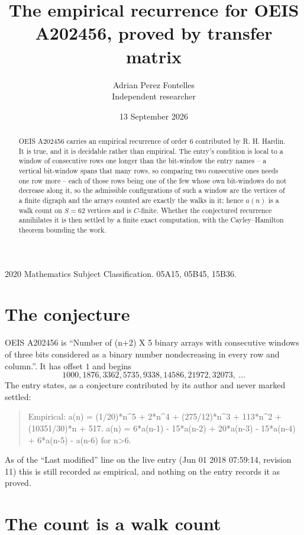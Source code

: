\documentclass[11pt,a4paper]{article}
\title{The empirical recurrence for OEIS A202456, proved by transfer matrix}
\author{Adrian Perez Fontelles\\ \small Independent researcher}
\date{13 September 2026}
\theoremstyle{plain}
\theoremstyle{definition}
\begin{document}
\maketitle

\begin{abstract}
OEIS A202456 carries an empirical recurrence of order $6$ contributed by R. H. Hardin. It is
true, and it is decidable rather than empirical. The entry's condition is local to a window of consecutive rows one longer than the bit-window the entry names -- a vertical bit-window spans that many rows, so comparing two consecutive ones needs one row more -- each of those rows being one of the few whose own bit-windows do not decrease along it, so
the admissible configurations of such a window are the vertices of a finite digraph and the
arrays counted are exactly the walks in it; hence $a(n)$ is a walk count on $S=62$ vertices
and is $C$-finite. Whether the conjectured recurrence annihilates it is then settled by a
finite exact computation, with the Cayley--Hamilton theorem bounding the work.
\end{abstract}

\noindent\small 2020 Mathematics Subject Classification. 05A15, 05B45, 15B36.\normalsize

\section{The conjecture}

OEIS A202456 is ``Number of (n+2) X 5 binary arrays with consecutive windows of three bits considered as a binary number nondecreasing in every row and column.''. It has offset $1$ and begins
\[
1000, 1876, 3362, 5735, 9338, 14586, 21972, 32073,\ \dots
\]
The entry states, as a conjecture contributed by its author and never marked settled:
\begin{quote}
Empirical: a(n) = (1/20)*n\^{}5 + 2*n\^{}4 + (275/12)*n\^{}3 + 113*n\^{}2 + (10351/30)*n + 517. a(n) = 6*a(n-1) - 15*a(n-2) + 20*a(n-3) - 15*a(n-4) + 6*a(n-5) - a(n-6) for n>6.
\end{quote}
As of the ``Last modified'' line on the live entry (Jun 01 2018 07:59:14, revision 11) this is still
recorded as empirical, and nothing on the entry records it as proved.

\section{The count is a walk count}
\end{document}
